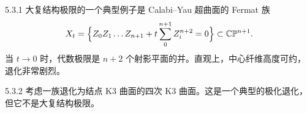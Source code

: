 \begin{example}{5.3.1}
大复结构极限的一个典型例子是 Calabi--Yau 超曲面的 Fermat 族
\[
X_t = \Big\{Z_0Z_1\dots Z_{n+1} + t\sum_{0}^{n+1}Z_i^{n+2}=0\Big\}\subset\mathbb{C}\mathbb{P}^{n+1}.
\]
当 $t\to0$ 时，代数极限是 $n+2$ 个射影平面的并。直观上，中心纤维高度可约，退化非常剧烈。
\end{example}


\begin{example}{5.3.2}
考虑一族退化为结点 K3 曲面的四次 K3 曲面。这是一个典型的极化退化，但它不是大复结构极限。
\end{example}
